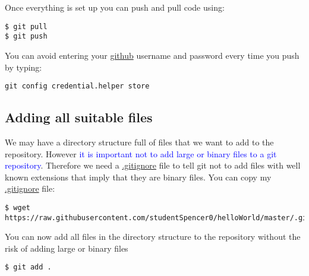 \clearpage{}

Once everything is set up you can push and pull code using:
\begin{lstlisting}
$ git pull
$ git push
\end{lstlisting}
You can avoid entering your \url{github} username and password every
time you push by typing:
\begin{lstlisting}
git config credential.helper store
\end{lstlisting}
\pause 

\subsection{Adding all suitable files}

We may have a directory structure full of files that we want to add
to the repository. However \textcolor{blue}{it is important not to
add large or binary files to a git repository}. Therefore we need
a \url{.gitignore} file to tell git not to add files with well known
extensions that imply that they are binary files. You can copy my
\url{.gitignore} file:

\begin{lstlisting}[basicstyle=\scriptsize]
$ wget https://raw.githubusercontent.com/studentSpencer0/helloWorld/master/.gitignore
\end{lstlisting}

You can now add all files in the directory structure to the repository
without the risk of adding large or binary files
\begin{lstlisting}
$ git add .
\end{lstlisting}
\clearpage{}

